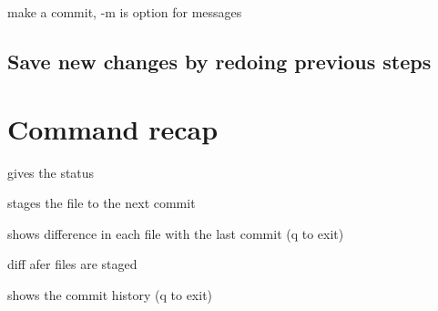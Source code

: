 

		 make a commit, -m is option for messages

	\subsection{Save new changes by redoing previous steps}


\section{Command recap}

	 gives the status

	 stages the file to the next commit

	 shows difference in each file with the last commit (q to exit)

	 diff afer files are staged

	 shows the commit history (q to exit)